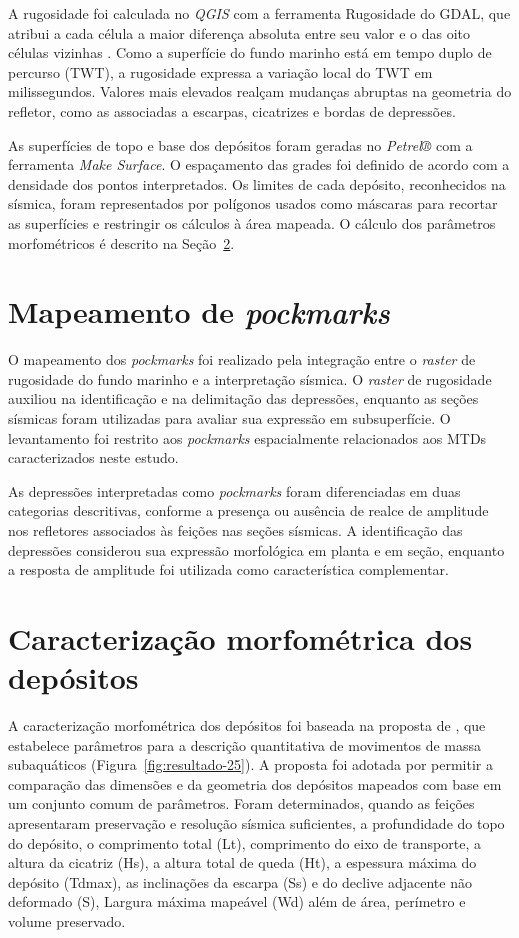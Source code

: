 A rugosidade foi calculada no \textit{QGIS} com a ferramenta Rugosidade do GDAL, que atribui a cada célula a maior diferença absoluta entre seu valor e o das oito células vizinhas \cite{wilson2007}. Como a superfície do fundo marinho está em tempo duplo de percurso (TWT), a rugosidade expressa a variação local do TWT em milissegundos. Valores mais elevados realçam mudanças abruptas na geometria do refletor, como as associadas a escarpas, cicatrizes e bordas de depressões.

As superfícies de topo e base dos depósitos foram geradas no \textit{Petrel®} com a ferramenta \textit{Make Surface}. O espaçamento das grades foi definido de acordo com a densidade dos pontos interpretados. Os limites de cada depósito, reconhecidos na sísmica, foram representados por polígonos usados como máscaras para recortar as superfícies e restringir os cálculos à área mapeada. O cálculo dos parâmetros morfométricos é descrito na Seção~\ref{sec:4-3}.

\section{Mapeamento de \textit{pockmarks}}\label{sec:4-2}

O mapeamento dos \textit{pockmarks} foi realizado pela integração entre o \textit{\textit{raster}} de rugosidade do fundo marinho e a interpretação sísmica. O \textit{\textit{raster}} de rugosidade auxiliou na identificação e na delimitação das depressões, enquanto as seções sísmicas foram utilizadas para avaliar sua expressão em subsuperfície. O levantamento foi restrito aos\textit{ pockmarks} espacialmente relacionados aos MTDs caracterizados neste estudo.

As depressões interpretadas como \textit{pockmarks} foram diferenciadas em duas categorias descritivas, conforme a presença ou ausência de realce de amplitude nos refletores associados às feições nas seções sísmicas. A identificação das depressões considerou sua expressão morfológica em planta e em seção, enquanto a resposta de amplitude foi utilizada como característica complementar.

\section{Caracterização morfométrica dos depósitos}\label{sec:4-3}

A caracterização morfométrica dos depósitos foi baseada na proposta de , que estabelece parâmetros para a descrição quantitativa de movimentos de massa subaquáticos (Figura~\ref{fig:resultado-25}). A proposta foi adotada por permitir a comparação das dimensões e da geometria dos depósitos mapeados com base em um conjunto comum de parâmetros. Foram determinados, quando as feições apresentaram preservação e resolução sísmica suficientes, a profundidade do topo do depósito, o comprimento total (Lt), comprimento do eixo de transporte, a altura da cicatriz (Hs), a altura total de queda (Ht), a espessura máxima do depósito (Tdmax), as inclinações da escarpa (Ss) e do declive adjacente não deformado (S), Largura máxima mapeável (Wd) além de área, perímetro e volume preservado.


